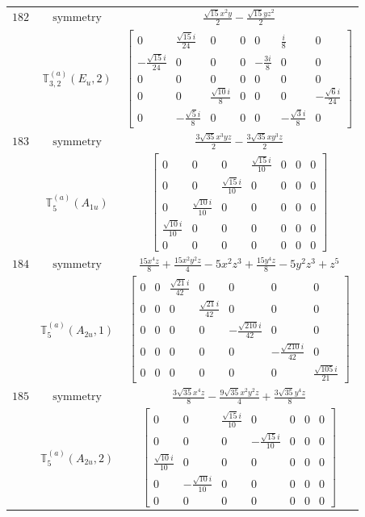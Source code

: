 \documentclass[fleqn,8pt,landscape]{jsarticle}
\begin{document}
\begin{longtable}{ccc}
$ 182 $ & $ \text{symmetry} $ & $ \frac{\sqrt{15} x^{2} y}{2} - \frac{\sqrt{15} y z^{2}}{2} $ \\
$  $ & $ \mathbb{T}_{3,2}^{(a)}(E_{u},2) $ & $ \begin{bmatrix} 0 & \frac{\sqrt{15} i}{24} & 0 & 0 & 0 & \frac{i}{8} & 0 \\ - \frac{\sqrt{15} i}{24} & 0 & 0 & 0 & - \frac{3 i}{8} & 0 & 0 \\ 0 & 0 & 0 & 0 & 0 & 0 & 0 \\ 0 & 0 & \frac{\sqrt{10} i}{8} & 0 & 0 & 0 & - \frac{\sqrt{6} i}{24} \\ 0 & - \frac{\sqrt{5} i}{8} & 0 & 0 & 0 & - \frac{\sqrt{3} i}{8} & 0 \end{bmatrix} $ \\ \hline
$ 183 $ & $ \text{symmetry} $ & $ \frac{3 \sqrt{35} x^{3} y z}{2} - \frac{3 \sqrt{35} x y^{3} z}{2} $ \\
$  $ & $ \mathbb{T}_{5}^{(a)}(A_{1u}) $ & $ \begin{bmatrix} 0 & 0 & 0 & \frac{\sqrt{15} i}{10} & 0 & 0 & 0 \\ 0 & 0 & \frac{\sqrt{15} i}{10} & 0 & 0 & 0 & 0 \\ 0 & \frac{\sqrt{10} i}{10} & 0 & 0 & 0 & 0 & 0 \\ \frac{\sqrt{10} i}{10} & 0 & 0 & 0 & 0 & 0 & 0 \\ 0 & 0 & 0 & 0 & 0 & 0 & 0 \end{bmatrix} $ \\ \hline
$ 184 $ & $ \text{symmetry} $ & $ \frac{15 x^{4} z}{8} + \frac{15 x^{2} y^{2} z}{4} - 5 x^{2} z^{3} + \frac{15 y^{4} z}{8} - 5 y^{2} z^{3} + z^{5} $ \\
$  $ & $ \mathbb{T}_{5}^{(a)}(A_{2u},1) $ & $ \begin{bmatrix} 0 & 0 & \frac{\sqrt{21} i}{42} & 0 & 0 & 0 & 0 \\ 0 & 0 & 0 & \frac{\sqrt{21} i}{42} & 0 & 0 & 0 \\ 0 & 0 & 0 & 0 & - \frac{\sqrt{210} i}{42} & 0 & 0 \\ 0 & 0 & 0 & 0 & 0 & - \frac{\sqrt{210} i}{42} & 0 \\ 0 & 0 & 0 & 0 & 0 & 0 & \frac{\sqrt{105} i}{21} \end{bmatrix} $ \\ \hline
$ 185 $ & $ \text{symmetry} $ & $ \frac{3 \sqrt{35} x^{4} z}{8} - \frac{9 \sqrt{35} x^{2} y^{2} z}{4} + \frac{3 \sqrt{35} y^{4} z}{8} $ \\
$  $ & $ \mathbb{T}_{5}^{(a)}(A_{2u},2) $ & $ \begin{bmatrix} 0 & 0 & \frac{\sqrt{15} i}{10} & 0 & 0 & 0 & 0 \\ 0 & 0 & 0 & - \frac{\sqrt{15} i}{10} & 0 & 0 & 0 \\ \frac{\sqrt{10} i}{10} & 0 & 0 & 0 & 0 & 0 & 0 \\ 0 & - \frac{\sqrt{10} i}{10} & 0 & 0 & 0 & 0 & 0 \\ 0 & 0 & 0 & 0 & 0 & 0 & 0 \end{bmatrix} $ \\ \hline

\end{longtable}
\end{document}
